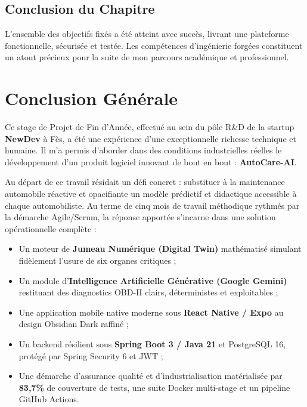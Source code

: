 \documentclass[12pt,a4paper,oneside]{report}
\newcommand{\bpuce}{\textcolor{midBlue}{$\blacktriangleright$}\;}
\begin{document}
\section{Conclusion du Chapitre}
L'ensemble des objectifs fix\'es a \'et\'e atteint avec succ\`es, livrant une plateforme fonctionnelle, s\'ecuris\'ee et test\'ee. Les comp\'etences d'ing\'enierie forg\'ees constituent un atout pr\'ecieux pour la suite de mon parcours acad\'emique et professionnel.

\clearpage

\chapter*{Conclusion G\'en\'erale}

Ce stage de Projet de Fin d'Ann\'ee, effectu\'e au sein du p\^ole R\&D de la startup \textbf{NewDev} \`a F\`es, a \'et\'e une exp\'erience d'une exceptionnelle richesse technique et humaine. Il m'a permis d'aborder dans des conditions industrielles r\'eelles le d\'eveloppement d'un produit logiciel innovant de bout en bout : \textbf{AutoCare-AI}.

Au d\'epart de ce travail r\'esidait un d\'efi concret : substituer \`a la maintenance automobile r\'eactive et opacifiante un mod\`ele pr\'edictif et didactique accessible \`a chaque automobiliste. Au terme de cinq mois de travail m\'ethodique rythm\'es par la d\'emarche Agile/Scrum, la r\'eponse apport\'ee s'incarne dans une solution op\'erationnelle compl\`ete :
\begin{itemize}[label=\bpuce]
  \item Un moteur de \textbf{Jumeau Num\'erique (Digital Twin)} math\'ematis\'e simulant fid\`element l'usure de six organes critiques ;
  \item Un module d'\textbf{Intelligence Artificielle G\'en\'erative (Google Gemini)} restituant des diagnostics OBD-II clairs, d\'eterministes et exploitables ;
  \item Une application mobile native moderne sous \textbf{React Native / Expo} au design Obsidian Dark raffin\'e ;
  \item Un backend r\'esilient sous \textbf{Spring Boot 3 / Java 21} et PostgreSQL 16, prot\'eg\'e par Spring Security 6 et JWT ;
  \item Une d\'emarche d'assurance qualit\'e et d'industrialisation mat\'erialis\'ee par \textbf{83,7\%} de couverture de tests, une suite Docker multi-stage et un pipeline GitHub Actions.
\end{itemize}
\end{document}
